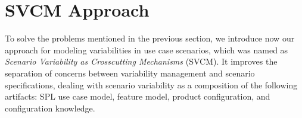 \documentclass{acm_proc_article-sp}
\begin{document}


%


\section{SVCM Approach}
\label{sec:svmc}

To solve the problems mentioned in the previous section, we introduce now our
approach for modeling variabilities in use case scenarios, which was named as
\emph{Scenario Variability as Crosscutting Mechanisms} (SVCM). It improves the
separation of concerns between variability management and scenario specifications, dealing with scenario variability as a composition of the
following artifacts: SPL use case model, feature model, product configuration,
and configuration knowledge.
\end{document}
